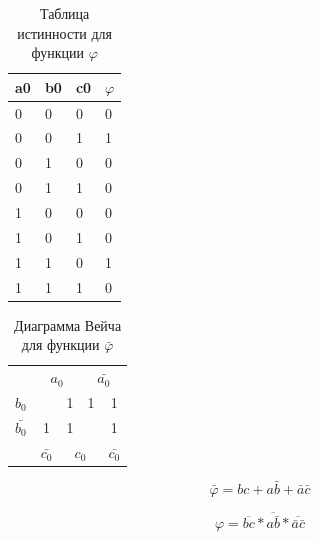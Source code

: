 \documentclass[a4paper,14pt]{article}
\begin{document}
\begin{table}[H]
	\begin{center}
		\caption{\label{tab:perSet} Таблица истинности для функции $\varphi$}
		
	\begin{tabular}{|l|l|l|l|}
		\hline
		a0 & b0 & c0 & $\varphi$ \\ \hline
		0  & 0  & 0  & 0  \\ \hline
		0  & 0  & 1  & 1  \\ \hline
		0  & 1  & 0  & 0  \\ \hline
		0  & 1  & 1  & 0  \\ \hline
		1  & 0  & 0  & 0  \\ \hline
		1  & 0  & 1  & 0  \\ \hline
		1  & 1  & 0  & 1  \\ \hline
		1  & 1  & 1  & 0  \\ \hline
	\end{tabular}
\end{center}
\end{table}

\begin{table}[H]
	\begin{center}
		\caption{\label{tab:perSet_ve} Диаграмма Вейча для функции  $\bar{\varphi}$}

\begin{tabular}{ccccc}
	& \multicolumn{2}{c}{$a_0$}                           & \multicolumn{2}{c}{$\bar{a_0}$}                          \\ \cline{2-5} 
	\multicolumn{1}{c|}{$b_0$}  & \multicolumn{1}{c|}{}  & \multicolumn{1}{c|}{1} & \multicolumn{1}{c|}{1} & \multicolumn{1}{c|}{1} \\ \cline{2-5} 
	\multicolumn{1}{c|}{$\bar{b_0}$} & \multicolumn{1}{c|}{1} & \multicolumn{1}{c|}{1} & \multicolumn{1}{c|}{}  & \multicolumn{1}{c|}{1} \\ \cline{2-5} 
	& $\bar{c_0}$                    & \multicolumn{2}{c}{$c_0$}                           & $\bar{c_0}$                   
\end{tabular}
\end{center}
\end{table}

$$\bar\varphi = bc + a\bar{b} + \bar{a}\bar{c}$$

$$\varphi = \overline{bc} *  \overline{a\bar{b}} * \overline{\bar{a}\bar{c}}$$
\end{document}
